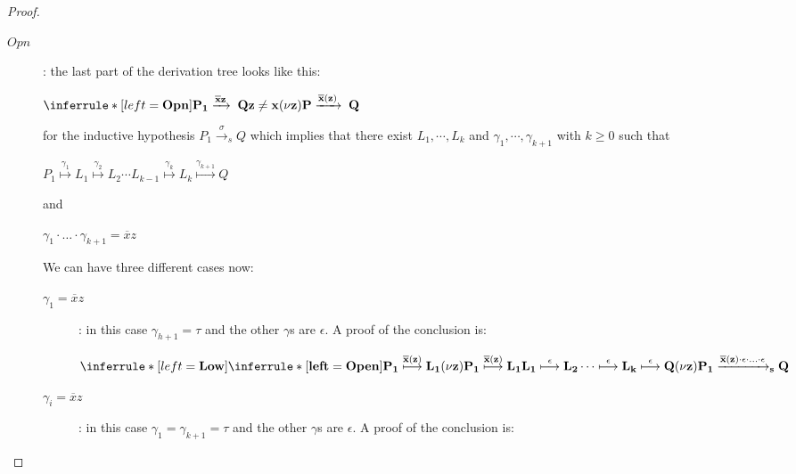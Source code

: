 \begin{proposition}
\begin{proof}
\begin{description}
      \item[$Opn$]: 
	the last part of the derivation tree looks like this:
	\begin{center}
	  $$	 
	\end{center}
	for the inductive hypothesis $P_{1} \xrightarrow{\sigma}_{s} Q$ which implies that there exist $L_{1}, \cdots, L_{k}$ and $\gamma_{1}, \cdots, \gamma_{k+1}$ with $k$ such that 
	\begin{center}
	  $P_{1}  L_{1}   L_{2} \cdots L_{k-1}  L_{k}  Q$ 
	\end{center}
	and 
	\begin{center}
	  $\gamma_{1} \cdot \ldots \cdot \gamma_{k+1} =  z$
	\end{center}
	We can have three different cases now: 
	\begin{description}
	  \item[$\gamma_{1}=z$]:
	    in this case $\gamma_{h+1}=\tau$ and the other $\gamma$s are $\epsilon$. A proof of the conclusion is:
	    \begin{center}
	      $$	  
	    \end{center}
	  \item[$\gamma_{i}=z$]:
	    in this case $\gamma_{1}=\gamma_{k+1}=\tau$ and the other $\gamma$s are $\epsilon$. A proof of the conclusion is:
	    \begin{center}

\end{center}
\end{description}
\end{description}
\end{proof}
\end{proposition}
